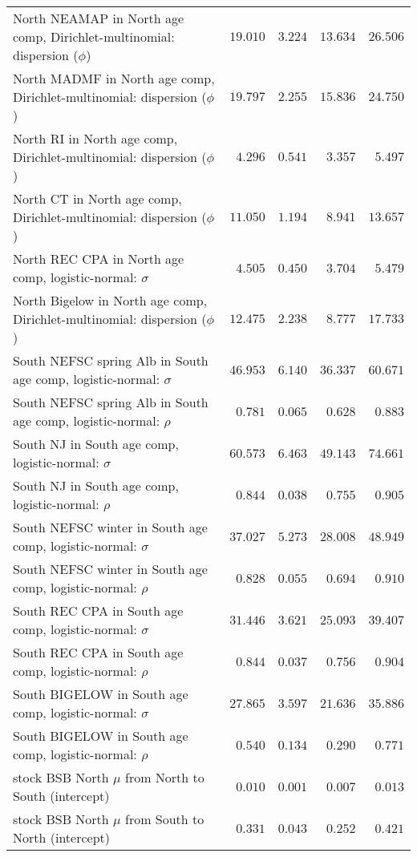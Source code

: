\documentclass[
]{article}
\begin{document}
\begin{landscape}
\begin{longtable}[t]{lrrrr}
North NEAMAP in North age comp, Dirichlet-multinomial: dispersion ($\phi$) & $19.010$ & $3.224$ & $13.634$ & $26.506$\\
\addlinespace
North MADMF in North age comp, Dirichlet-multinomial: dispersion ($\phi$) & $19.797$ & $2.255$ & $15.836$ & $24.750$\\
North RI in North age comp, Dirichlet-multinomial: dispersion ($\phi$) & $4.296$ & $0.541$ & $3.357$ & $5.497$\\
North CT in North age comp, Dirichlet-multinomial: dispersion ($\phi$) & $11.050$ & $1.194$ & $8.941$ & $13.657$\\
North REC CPA in North age comp, logistic-normal: $\sigma$ & $4.505$ & $0.450$ & $3.704$ & $5.479$\\
North Bigelow in North age comp, Dirichlet-multinomial: dispersion ($\phi$) & $12.475$ & $2.238$ & $8.777$ & $17.733$\\
\addlinespace
South NEFSC spring Alb in South age comp, logistic-normal: $\sigma$ & $46.953$ & $6.140$ & $36.337$ & $60.671$\\
South NEFSC spring Alb in South age comp, logistic-normal: $\rho$ & $0.781$ & $0.065$ & $0.628$ & $0.883$\\
South NJ in South age comp, logistic-normal: $\sigma$ & $60.573$ & $6.463$ & $49.143$ & $74.661$\\
South NJ in South age comp, logistic-normal: $\rho$ & $0.844$ & $0.038$ & $0.755$ & $0.905$\\
South NEFSC winter in South age comp, logistic-normal: $\sigma$ & $37.027$ & $5.273$ & $28.008$ & $48.949$\\
\addlinespace
South NEFSC winter in South age comp, logistic-normal: $\rho$ & $0.828$ & $0.055$ & $0.694$ & $0.910$\\
South REC CPA in South age comp, logistic-normal: $\sigma$ & $31.446$ & $3.621$ & $25.093$ & $39.407$\\
South REC CPA in South age comp, logistic-normal: $\rho$ & $0.844$ & $0.037$ & $0.756$ & $0.904$\\
South BIGELOW in South age comp, logistic-normal: $\sigma$ & $27.865$ & $3.597$ & $21.636$ & $35.886$\\
South BIGELOW in South age comp, logistic-normal: $\rho$ & $0.540$ & $0.134$ & $0.290$ & $0.771$\\
\addlinespace
stock BSB North $\mu$ from North to South (intercept) & $0.010$ & $0.001$ & $0.007$ & $0.013$\\
stock BSB North $\mu$ from South to North (intercept) & $0.331$ & $0.043$ & $0.252$ & $0.421$\\

\end{longtable}
\end{landscape}
\end{document}
